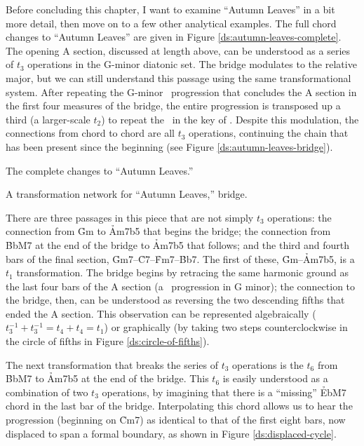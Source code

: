 \documentclass[diss]{subfiles}
\begin{document}
Before concluding this chapter, I want to examine “Autumn Leaves” in a bit
more detail, then move on to a few other analytical examples. The full chord
changes to “Autumn Leaves” are given in Figure
\ref{ds:autumn-leaves-complete}. The opening A section, discussed at length
above, can be understood as a series of $t_3$ operations in the G-minor
diatonic set. The bridge modulates to the relative major, but we can still
understand this passage using the same transformational system. After
repeating the G-minor \tfo\ progression that concludes the A section in the
first four measures of the bridge, the entire progression is transposed up a
third (a larger-scale $t_2$) to repeat the \tfo\ in the key of \Bflat. Despite
this modulation, the connections from chord to chord are all $t_3$ operations,
continuing the chain that has been present since the beginning (see Figure
\ref{ds:autumn-leaves-bridge}).

\figBeg[htbp]
  \caption{The complete changes to “Autumn Leaves.”}
  \label{ds:autumn-leaves-complete}
\figEnd

\figBeg[htbp]
  \vspace{\baselineskip}
  \caption{A transformation network for “Autumn Leaves,” bridge.}
  \label{ds:autumn-leaves-bridge}
\figEnd

There are three passages in this piece that are not simply $t_3$ operations:
the connection from \h{Gm} to \h{Am7b5} that begins the bridge; the connection
from \h{BbM7} at the end of the bridge to \h{Am7b5} that follows; and the
third and fourth bars of the final section,
\h{Gm7}--\h{C7}--\h{Fm7}--\h{Bb7}. The first of these, \h{Gm}--\h{Am7b5}, is a
$t_1$ transformation. The bridge begins by retracing the same harmonic ground
as the last four bars of the A section (a \tfo\ progression in G minor); the
connection to the bridge, then, can be understood as reversing the two
descending fifths that ended the A section. This observation can be
represented algebraically ($t_3^{-1} + t_3^{-1} = t_4 + t_4 = t_1$) or
graphically (by taking two steps counterclockwise in the circle of fifths in
Figure \ref{ds:circle-of-fifths}).

The next transformation that breaks the series of $t_3$ operations is the
$t_6$ from \h{BbM7} to \h{Am7b5} at the end of the bridge. This $t_6$ is
easily understood as a combination of two $t_3$ operations, by imagining that
there is a “missing” \h{EbM7} chord in the last bar of the bridge.
Interpolating this chord allows us to hear the progression (beginning on
\h{Cm7}) as identical to that of the first eight bars, now displaced to span a
formal boundary, as shown in Figure \ref{ds:displaced-cycle}.
\end{document}
